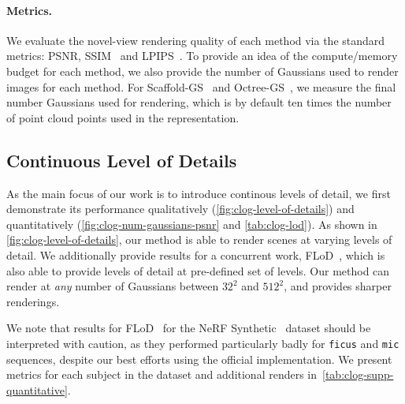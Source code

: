       
      
      
    \paragraph{Metrics.}
      We evaluate the novel-view rendering quality of each method via the standard
      metrics: PSNR, SSIM~\cite{wang2004image} and LPIPS~\cite{zhang2018perceptual}.
      To provide an idea of the compute/memory budget for each method, we also
      provide the number of Gaussians used to render images for each method.
      For Scaffold-GS~\cite{lu2024scaffold} and Octree-GS~\cite{ren2024octree}, we
      measure the final number Gaussians used for rendering, which is by default ten
      times the number of point cloud points used in the representation.


      
      
      
      
      
  \subsection{Continuous Level of Details}

    As the main focus of our work is to introduce continous levels of detail, we
    first demonstrate its performance qualitatively
    (\cref{fig:clog-level-of-details}) and quantitatively
    (\cref{fig:clog-num-gaussians-psnr} and \cref{tab:clog-lod}).
    As shown in \cref{fig:clog-level-of-details}, our method is able to render
    scenes at varying levels of detail.
    We additionally provide results for a concurrent work,
    FLoD~\cite{seo2024flod}, which is also able to provide levels of detail at
    pre-defined set of levels.
    Our method can render at \emph{any} number of Gaussians between $32^2$ and
    $512^2$, and provides sharper renderings.

    We note that results for FLoD~\cite{seo2024flod} for the NeRF
    Synthetic~\cite{mildenhall2020nerf} dataset should be interpreted with
    caution, as they performed particularly badly for \texttt{ficus} and
    \texttt{mic} sequences, despite our best efforts using the official
    implementation.
    We present metrics for each subject in the dataset and additional renders
    in~\cref{tab:clog-supp-quantitative}.

